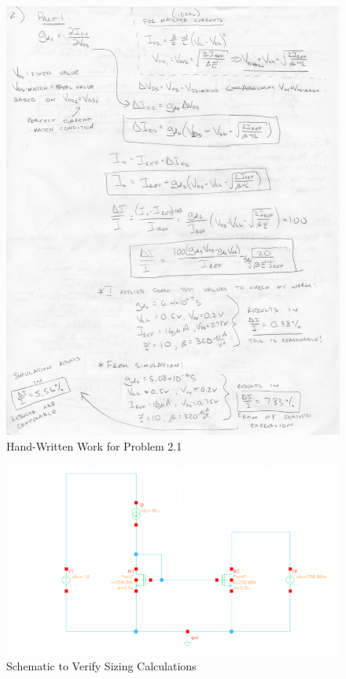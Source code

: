 \documentclass{article}
\begin{document}
\begin{figure}[H]
\centering
\includegraphics[width=6in]{1_4}
\caption{Hand-Written Work for Problem 2.1}
\label{2_1}
\end{figure}

\begin{figure}[H]
\centering
\includegraphics[width=6in]{p2_1_schem.png}
\caption{Schematic to Verify Sizing Calculations}
\label{2_1_schem}
\end{figure}
\end{document}
